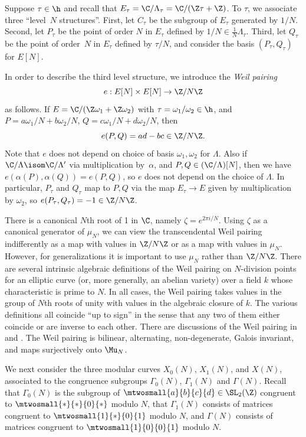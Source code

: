 \documentclass{report}
\begin{document}
Suppose $\tau\in\h$ and recall that $E_\tau = \C/\Lambda_\tau =
\C/(\Z\tau + \Z)$.  To $\tau$, we associate three ``level~$N$
structures''.  First, let $C_\tau$ be the subgroup of $E_\tau$
generated by $1/N$.  Second, let $P_\tau$ be the point of order
$N$ in $E_\tau$ defined by $1/N\in \frac{1}{N}\Lambda_\tau$.   Third, let
$Q_\tau$ be the point of order~$N$ in $E_\tau$ defined by
$\tau/N$, and consider the basis $(P_\tau,Q_\tau)$ for $E[N]$.

In order to describe the third level structure, we introduce the
{\em Weil pairing}
$$e:E[N]\times E[N]\to \Z/N\Z$$ as follows. If $E=\C/(\Z\omega_1+\Z\omega_2)$ with
$\tau = \omega_1/\omega_2\in\h$, and $P=a\omega_1/N + b\omega_2/N$,
$Q=c\omega_1/N + d\omega_2/N$, then $$e(P,Q) = ad-bc\in\Z/N\Z.$$
Note that $e$ does not depend on choice of basis
$\omega_1,\omega_2$ for $\Lambda$.
Also if
$\C/\Lambda\isom \C/\Lambda'$ via multiplication by~$\alpha$, and
$P,Q\in(\C/\Lambda)[N]$, then we have $e(\alpha(P),\alpha(Q)) = e(P,Q)$,
so $e$ does not depend on the choice of $\Lambda$.
In particular, $P_{\tau}$ and $Q_{\tau}$ map to
$P,Q$ via the map $E_{\tau}\to E$ given by multiplication
by $\omega_2$, so $e(P_\tau,Q_\tau) = -1\in\Z/N\Z$.

\begin{remark}
  There is a canonical $N$th root of 1 in $\C$, namely $\zeta =
  e^{2\pi i / N}$.  Using $\zeta$ as a canonical generator of $\mu_N$,
  we can view the transcendental Weil pairing indifferently as a map
  with values in $\Z/N\Z$ or as a map with values in $\mu_N$.
  However, for generalizations it is important to use $\mu_N$ rather
  than $\Z/N\Z$.  There are several intrinsic algebraic definitions of
  the Weil pairing on $N$-division points for an elliptic curve (or,
  more generally, an abelian variety) over a field $k$ whose
  characteristic is prime to $N$.  In all cases, the Weil pairing
  takes values in the group of $N$th roots of unity with values in the
  algebraic closure of $k$.  The various definitions all coincide ``up
  to sign'' in the sense that any two of them either coincide or are
  inverse to each other.  There are discussions of the Weil pairing in
  \cite[\S5.2]{katz:st-local_moduli} and \cite[III.8]{silverman:aec}.
  The Weil pairing is bilinear, alternating, non-degenerate, Galois
  invariant, and maps surjectively onto $\Mu_N$.
\end{remark}

We next consider the three modular curves $X_0(N)$, $X_1(N)$, and
$X(N)$, associated to the congruence subgroups $\Gamma_0(N)$,
$\Gamma_1(N)$ and $\Gamma(N)$.  Recall that $\Gamma_0(N)$ is the
subgroup of $\mtwosmall{a}{b}{c}{d}\in\SL_2(\Z)$ congruent to
$\mtwosmall{*}{*}{0}{*}$ modulo $N$, that $\Gamma_1(N)$ consists of
matrices congruent to $\mtwosmall{1}{*}{0}{1}$ modulo $N$, and $\Gamma(N)$
consists of matrices congruent to $\mtwosmall{1}{0}{0}{1}$ modulo $N$.
\end{document}
